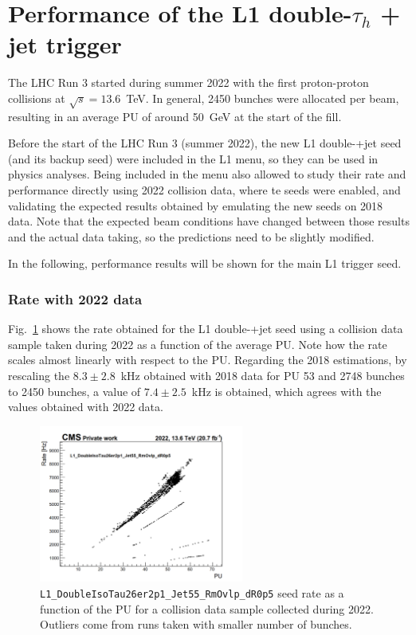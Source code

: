 \documentclass[../main.tex]{subfiles}
\begin{document}
\section{Performance of the L1 double-$\tau_h$ + jet trigger}
\label{hh:sec:l1_performance}

The LHC Run 3 started during summer 2022 with the first proton-proton collisions at $\sqrt{s}=13.6$~TeV. In general, 2450 bunches were allocated per beam, resulting in an average PU of around 50~GeV at the start of the fill.

Before the start of the LHC Run 3 (summer 2022), the new L1 double-\tauh{}+jet seed (and its backup seed) were included in the L1 menu, so they can be used in physics analyses. Being included in the menu also allowed to study their rate and performance directly using 2022 collision data, where te seeds were enabled, and validating the expected results obtained by emulating the new seeds on 2018 data. Note that the expected beam conditions have changed between those results and the actual data taking, so the predictions need to be slightly modified.

In the following, performance results will be shown for the main L1 trigger seed.

\subsubsection{Rate with 2022 data}

Fig.~\ref{hh:fig:l1_rate_run3} shows the rate obtained for the L1 double-\tauh{}+jet seed using a collision data sample taken during 2022 as a function of the average PU. Note how the rate scales almost linearly with respect to the PU. Regarding the 2018 estimations, by rescaling the $8.3\pm2.8$~kHz obtained with 2018 data for PU 53 and 2748 bunches to 2450 bunches, a value of $7.4\pm2.5$~kHz is obtained, which agrees with the values obtained with 2022 data.


\begin{figure}[h!]
\begin{center}
\includegraphics[width=0.6\textwidth]{Images/L1_rate}
\end{center}
\caption[\texttt{L1\_DoubleIsoTau26er2p1\_Jet55\_RmOvlp\_dR0p5} seed rate]{\texttt{L1\_DoubleIsoTau26er2p1\_Jet55\_RmOvlp\_dR0p5} seed rate as a function of the PU for a collision data sample collected during 2022. Outliers come from runs taken with smaller number of bunches.}
\label{hh:fig:l1_rate_run3}
\end{figure}
\end{document}
